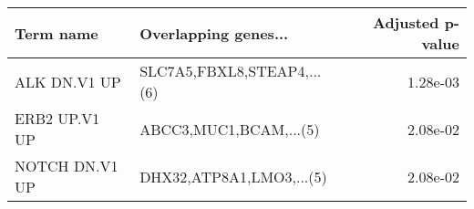 \begin{tabular}{llr}
\toprule
     Term name &       Overlapping genes... &  Adjusted p-value \\
\midrule
  ALK DN.V1 UP & SLC7A5,FBXL8,STEAP4,...(6) &          1.28e-03 \\
 ERB2 UP.V1 UP &     ABCC3,MUC1,BCAM,...(5) &          2.08e-02 \\
NOTCH DN.V1 UP &   DHX32,ATP8A1,LMO3,...(5) &          2.08e-02 \\
\bottomrule
\end{tabular}
